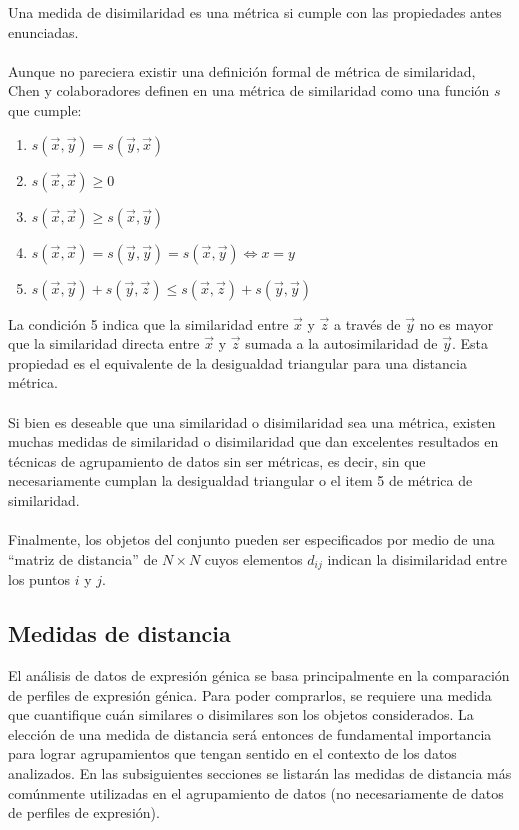 Una medida de disimilaridad es una métrica si cumple con las propiedades antes enunciadas. \\\\
Aunque no pareciera existir una definición formal de métrica de similaridad, Chen y colaboradores definen en \cite{Chen2009} una métrica de similaridad como una función $s$ que cumple:
\begin{enumerate}
\item $s(\vec{x}, \vec{y}) = s(\vec{y}, \vec{x})$
\item $s(\vec{x}, \vec{x}) \geq 0$
\item $s(\vec{x}, \vec{x}) \geq s(\vec{x}, \vec{y})$
\item $s(\vec{x}, \vec{x}) = s(\vec{y}, \vec{y}) = s(\vec{x}, \vec{y}) \iff x=y$
\item $s(\vec{x}, \vec{y}) + s(\vec{y}, \vec{z}) \leq s(\vec{x}, \vec{z}) + s(\vec{y}, \vec{y})$
\end{enumerate}
La condición 5 indica que la similaridad entre $\vec{x}$ y $\vec{z}$ a través de $\vec{y}$ no es mayor que la similaridad directa entre $\vec{x}$ y $\vec{z}$ sumada a la autosimilaridad de $\vec{y}$. Esta propiedad es el equivalente de la desigualdad triangular para una distancia métrica.\\\\
Si bien es deseable que una similaridad o disimilaridad sea una métrica, existen muchas medidas de similaridad o disimilaridad que dan excelentes resultados en técnicas de agrupamiento de datos sin ser métricas, es decir, sin que necesariamente cumplan la desigualdad triangular o el item 5 de métrica de similaridad.\cite{Chen2009}\\\\
Finalmente, los objetos del conjunto pueden ser especificados por medio de una ``matriz de distancia'' de $N\times N$ cuyos elementos $d_{ij}$ indican la disimilaridad entre los puntos $i$ y $j$.\cite{Halkidi2001, Domany1999, Gan2007, Kheng2010}

\subsection{Medidas de distancia}
El análisis de datos de expresión génica se basa principalmente en la comparación de perfiles de expresión génica. Para poder comprarlos, se requiere una medida que cuantifique cuán similares o disimilares son los objetos considerados. La elección de una medida de distancia será entonces de fundamental importancia para lograr agrupamientos que tengan sentido en el contexto de los datos analizados. En las subsiguientes secciones se listarán las medidas de distancia más comúnmente utilizadas en el agrupamiento de datos (no necesariamente de datos de perfiles de expresión).
